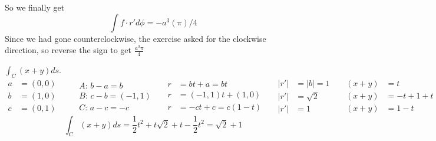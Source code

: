 \documentclass[twoside]{amsart}
\theoremstyle{plain}
\theoremstyle{definition}
\newcommand{\exercisehead}[1]
  {
   \noindent{\small\bf Exercise #1.}
   \smallskip}
\begin{document}
So we finally get 
\[
\int f \cdot r' d\phi = -a^3 (\pi)/4
\]
Since we had gone counterclockwise, the exercise asked for the clockwise direction, so reverse the sign to get $\boxed{ \frac{ a^3 \pi}{4} }$

\exercisehead{7} $\int_C (x+y)ds$.  
\[
\begin{aligned}
  a & = (0,0) \\ 
  b & = (1,0) \\
  c & = (0,1)
\end{aligned} \quad \, \begin{aligned} & A: \, b - a = b \\ & B: \, c-b = (-1,1) \\ & C: \, a-c = -c \end{aligned} \quad \, \begin{aligned} r & = bt + a = bt \\ r & = (-1,1)t + (1,0) \\ r & = -ct + c = c(1-t) \end{aligned} \quad \, \begin{aligned} |r'| & = |b| = 1 \\ |r'| & = \sqrt{2} \\ |r'| & = 1 \end{aligned} \quad \, \begin{aligned} (x+y) & = t \\ (x+y) & = -t + 1 + t = 1 \\ (x+y) & = 1 - t \end{aligned}
\]
\[
\int_C (x+y)ds = \frac{1}{2} t^2 + t\sqrt{2} + t - \frac{1}{2}t^2 = \sqrt{2}  + 1 
\]
\end{document}
